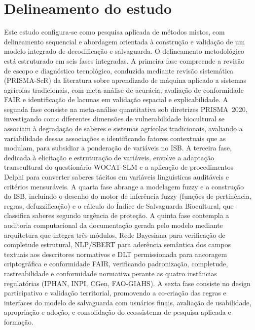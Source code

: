 \section{Delineamento do estudo}

Este estudo configura-se como pesquisa aplicada de métodos mistos, com delineamento sequencial e abordagem orientada à construção e validação de um modelo integrado de decodificação e salvaguarda. O delineamento metodológico está estruturado em seis fases integradas. A primeira fase compreende a revisão de escopo e diagnóstico tecnológico, conduzida mediante revisão sistemática (PRISMA-ScR) da literatura sobre aprendizado de máquina aplicado a sistemas agrícolas tradicionais, com meta-análise de acurácia, avaliação de conformidade FAIR e identificação de lacunas em validação espacial e explicabilidade. A segunda fase consiste na meta-análise quantitativa sob diretrizes PRISMA~2020, investigando como diferentes dimensões de vulnerabilidade biocultural se associam à degradação de saberes e sistemas agrícolas tradicionais, avaliando a variabilidade dessas associações e identificando fatores contextuais que as modulam, para subsidiar a ponderação de variáveis no ISB. A terceira fase, dedicada à elicitação e estruturação de variáveis, envolve a adaptação transcultural do questionário WOCAT-SLM e a aplicação de procedimentos Delphi para converter saberes tácitos em variáveis linguísticas auditáveis e critérios mensuráveis. A quarta fase abrange a modelagem fuzzy e a construção do ISB, incluindo o desenho do motor de inferência fuzzy (funções de pertinência, regras, defuzzificação) e o cálculo do Índice de Salvaguarda Biocultural, que classifica saberes segundo urgência de proteção. A quinta fase contempla a auditoria computacional da documentação gerada pelo modelo mediante arquitetura que integra três módulos, Rede Bayesiana para verificação de completude estrutural, NLP/SBERT para aderência semântica dos campos textuais aos descritores normativos e DLT permissionada para ancoragem criptográfica e conformidade FAIR, verificando padronização, completude, rastreabilidade e conformidade normativa perante as quatro instâncias regulatórias (IPHAN, INPI, CGen, FAO-GIAHS). A sexta fase consiste no design participativo e validação territorial, promovendo a co-criação das regras e interfaces do modelo de salvaguarda com usuários finais, avaliação de usabilidade, apropriação e adoção, e consolidação do ecossistema de pesquisa aplicada e formação.




